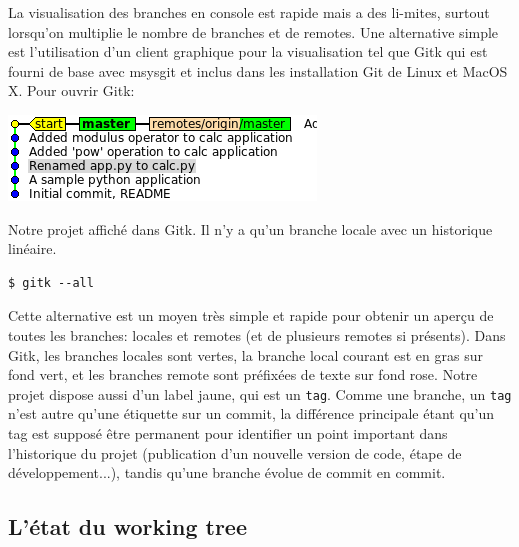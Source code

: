 \documentclass{../../common/tufte-latex/tufte-handout}
\begin{document}
La visualisation des branches en console est rapide mais a des li-mites, surtout lorsqu'on multiplie le nombre de branches et de remotes.
Une alternative simple est l'utilisation d'un client graphique pour la visualisation tel que Gitk qui est fourni de base avec msysgit et inclus dans les installation Git de Linux et MacOS X.
Pour ouvrir Gitk:

\begin{marginfigure}%
  \centering
  \includegraphics[width=\linewidth]{gitk-start.png}
  \label{fig:gitk-start}
  \caption{Notre projet affiché dans Gitk. Il n'y a qu'un branche locale avec un historique linéaire.}
\end{marginfigure}

\begin{lstlisting}[style=BashInputStyle]
  $ gitk --all
\end{lstlisting}

Cette alternative est un moyen très simple et rapide pour obtenir un aperçu de toutes les branches: locales et remotes (et de plusieurs remotes si présents).
Dans Gitk, les branches locales sont vertes, la branche local courant est en gras sur fond vert, et les branches remote sont préfixées de texte sur fond rose.
Notre projet dispose aussi d'un label jaune, qui est un \texttt{tag}.
Comme une branche, un \texttt{tag} n'est autre qu'une étiquette sur un commit, la différence principale étant qu'un tag est supposé être permanent pour identifier un point important dans l'historique du projet (publication d'un nouvelle version de code, étape de développement...), tandis qu'une branche évolue de commit en commit.

\subsection{L'état du working tree}
\end{document}
